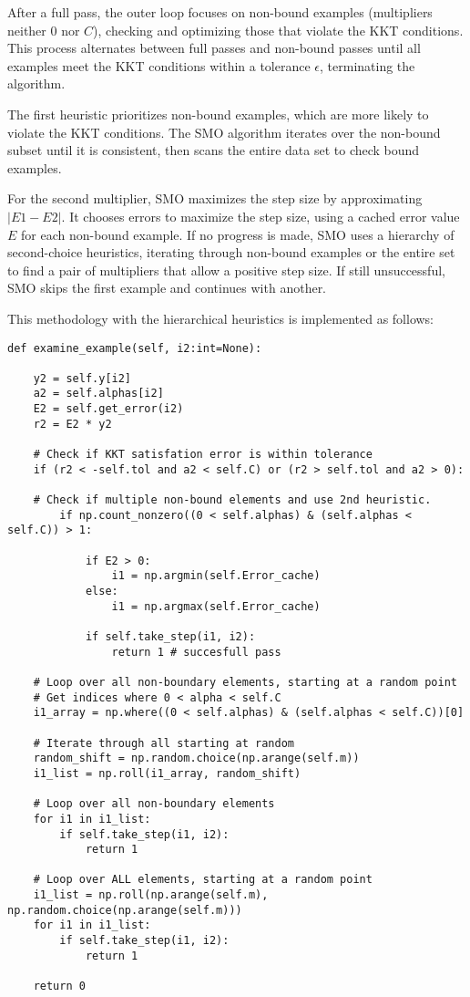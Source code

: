 \documentclass[10pt,a4paper]{article}
\begin{document}
After a full pass, the outer loop focuses on non-bound examples (multipliers neither 0 nor \(C\)), checking and optimizing those that violate the KKT conditions. This process alternates between full passes and non-bound passes until all examples meet the KKT conditions within a tolerance \(\epsilon\), terminating the algorithm.

The first heuristic prioritizes non-bound examples, which are more likely to violate the KKT conditions. The SMO algorithm iterates over the non-bound subset until it is consistent, then scans the entire data set to check bound examples.

For the second multiplier, SMO maximizes the step size by approximating \(| E1 - E2 |\). It chooses errors to maximize the step size, using a cached error value \(E\) for each non-bound example. If no progress is made, SMO uses a hierarchy of second-choice heuristics, iterating through non-bound examples or the entire set to find a pair of multipliers that allow a positive step size. If still unsuccessful, SMO skips the first example and continues with another.

This methodology with the hierarchical heuristics is implemented as follows:

\begin{lstlisting}
def examine_example(self, i2:int=None):

	y2 = self.y[i2]
	a2 = self.alphas[i2]
	E2 = self.get_error(i2)
	r2 = E2 * y2

	# Check if KKT satisfation error is within tolerance
	if (r2 < -self.tol and a2 < self.C) or (r2 > self.tol and a2 > 0):

	# Check if multiple non-bound elements and use 2nd heuristic.
		if np.count_nonzero((0 < self.alphas) & (self.alphas < self.C)) > 1:
	
			if E2 > 0:
				i1 = np.argmin(self.Error_cache)
			else:
				i1 = np.argmax(self.Error_cache)
	
			if self.take_step(i1, i2):
				return 1 # succesfull pass
	
	# Loop over all non-boundary elements, starting at a random point
	# Get indices where 0 < alpha < self.C
	i1_array = np.where((0 < self.alphas) & (self.alphas < self.C))[0]
	
	# Iterate through all starting at random
	random_shift = np.random.choice(np.arange(self.m))
	i1_list = np.roll(i1_array, random_shift)
	
	# Loop over all non-boundary elements
	for i1 in i1_list:
		if self.take_step(i1, i2):
			return 1
	
	# Loop over ALL elements, starting at a random point
	i1_list = np.roll(np.arange(self.m), np.random.choice(np.arange(self.m)))
	for i1 in i1_list:
		if self.take_step(i1, i2):
			return 1
	
	return 0
	
\end{lstlisting}
	
\end{document}
